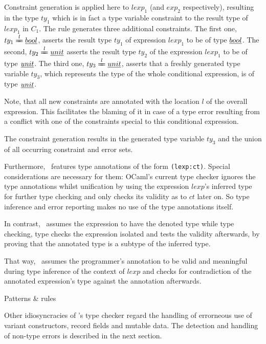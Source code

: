 Constraint generation is applied here to $lexp_1$ (and $exp_2$ respectively),
resulting  in the type $ty_1$ which is in fact a type variable constraint to
the result type of $lexp_1$ in $C_1$.
The rule generates three additional constraints.  The first one, $ty_1
\xlongequal l \type{bool}$, asserts the result type $ty_1$ of expression
$lexp_1$ to be of type $\underline{bool}$.
The second, $ty_2 \xlongequal l \type{unit}$ asserts the result type $ty_2$ of
the expression $lexp_1$ to be of type $\underline{unit}$.
The third one, $ty_3 \xlongequal l \type{unit}$, asserts that a freshly
generated type variable $ty_3$, which represents the type of the whole
conditional expression, is of type $\underline{unit}$.

Note, that all new constraints are annotated with the location $l$ of the
overall expression. This facilitates the blaming of it in case of a type error
resulting from a conflict with one of the constraints special to this
conditional expression.

The constraint generation results in the generated type variable $ty_3$ and the
union of all occurring constraint and error sets.

Furthermore, \easyocaml\ features type annotations of the form
\texttt{(lexp:ct)}.  Special considerations are necessary for them:
OCaml's current type checker ignores the type annotations whilst unification by
using the expression $lexp$'s inferred type for further type checking and only
checks its validity as to $ct$ later on.  So type inference and error reporting
makes no use of the type annotations itself.

In contrast, \easyocaml\ assumes the expression to have the denoted type while
type checking, type checks the expression isolated and tests the validity
afterwards, by proving that the annotated type is a subtype of the inferred type.

\vspace{1em}\centerline{
}\vspace{1em}

That way, \easyocaml\ assumes the programmer's annotation to be valid and
meaningful during type inference of the context of $lexp$ and checks for
contradiction of the annotated expression's type against the annotation
afterwards.

Patterns \& rules\more

Other idiosyncracies of \easyocaml's type checker regard the handling of
errorneous use of variant constructors, record fields and mutable data. The
detection and handling of non-type errors is described in the next section.

